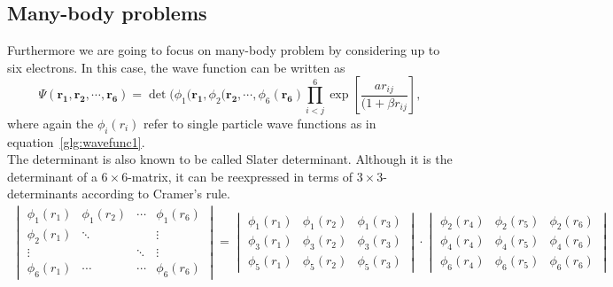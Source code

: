 \subsection{Many-body problems}
Furthermore we are going to focus on many-body problem by considering up to six electrons. In this case, the wave function can be written as
\begin{equation}
\Psi(\mathbf{r_1,r_2,\cdots, r_6}) = \det(\phi_1(\mathbf{r_1},\phi_2(\mathbf{r_2},\cdots,\phi_6(\mathbf{r_6}) \prod_{i<j}^6 \exp\left[\frac{a r_{ij}}{(1+\beta r_{ij}}\right],
\end{equation}
where again the $\phi_i(r_i)$ refer to single particle wave functions as in equation~\ref{glg:wavefunc1}.\\
The determinant is also known to be called Slater determinant. Although it is the determinant of a $6\times 6$-matrix, it can be reexpressed in terms of $3\times 3$-determinants according to Cramer's rule.
\begin{align}
\begin{vmatrix}
\phi_1(r_1) & \phi_1(r_2) & \cdots & \phi_1(r_6)\\
\phi_2(r_1) & \ddots & &\vdots \\
\vdots & & \ddots& \vdots\\
\phi_6(r_1) & \cdots & \cdots & \phi_6(r_6)
\end{vmatrix}
=
\begin{vmatrix}
\phi_1(r_1)& \phi_1(r_2)& \phi_1(r_3)\\
\phi_3(r_1)& \phi_3(r_2)& \phi_3(r_3)\\
\phi_5(r_1)& \phi_5(r_2)& \phi_5(r_3)
\end{vmatrix}
\cdot
\begin{vmatrix}
\phi_2(r_4)& \phi_2(r_5)& \phi_2(r_6)\\
\phi_4(r_4)& \phi_4(r_5)& \phi_4(r_6)\\
\phi_6(r_4)& \phi_6(r_5)& \phi_6(r_6)
\end{vmatrix}
\end{align}
